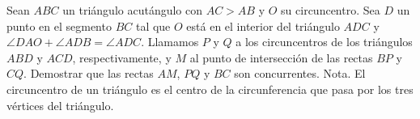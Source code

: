Sean $ABC$ un triángulo acutángulo con $AC > AB$ y $O$ su circuncentro. Sea $D$ un punto en el segmento $BC$ tal que $O$ está en el interior del triángulo $ADC$ y $\angle DAO + \angle ADB = \angle ADC$. Llamamos $P$ y $Q$ a los circuncentros de los triángulos $ABD$ y $ACD$, respectivamente, y $M$ al punto de intersección de las rectas $BP$ y $CQ$. Demostrar que las rectas $AM$, $PQ$ y $BC$ son concurrentes.
Nota. El circuncentro de un triángulo es el centro de la circunferencia que pasa por los tres vértices del triángulo.
